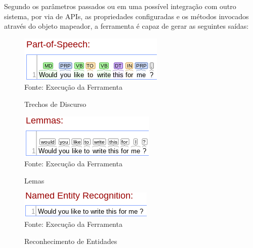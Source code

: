 Segundo os parâmetros passados ou em uma possível integração com outro sistema, por via de APIs, as propriedades configuradas e os métodos invocados através do objeto mapeador, a ferramenta é capaz de gerar as seguintes saídas:

\begin{figure}[H]
\centering
\caption{Trechos de Discurso} %
\includegraphics[scale=0.9]{01a}\\  %
{\small Fonte: Execução da Ferramenta} %
\label{fig:exemplo} %
\end{figure}

\begin{figure}[H]
\centering
\caption{Lemas} %
\includegraphics[scale=0.9]{02b}\\  %
{\small Fonte: Execução da Ferramenta} %
\label{fig:exemplo} %
\end{figure}

\begin{figure}[H]
\centering
\caption{Reconhecimento de Entidades} %
\includegraphics[scale=0.9]{03c}\\  %
{\small Fonte: Execução da Ferramenta} %
\label{fig:exemplo} %
\end{figure}


